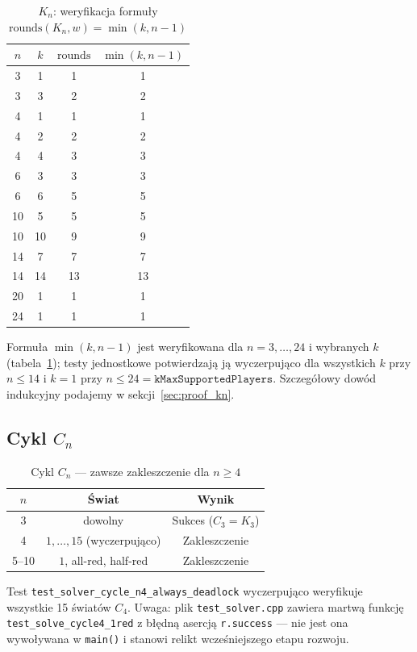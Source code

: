 \documentclass[12pt,a4paper]{article}
\theoremstyle{plain}
\theoremstyle{definition}
\theoremstyle{remark}
\newcommand{\rounds}{\mathrm{rounds}}
\begin{document}
\begin{table}[h]
\centering
\caption{$K_n$: weryfikacja formuły $\rounds(K_n, w) = \min(k, n-1)$}
\label{tab:kn}
\begin{tabular}{cccc}
\toprule
$n$ & $k$ & $\rounds$ & $\min(k,n-1)$ \\
\midrule
3 & 1 & 1 & 1 \\
3 & 3 & 2 & 2 \\
4 & 1 & 1 & 1 \\
4 & 2 & 2 & 2 \\
4 & 4 & 3 & 3 \\
6 & 3 & 3 & 3 \\
6 & 6 & 5 & 5 \\
10 & 5 & 5 & 5 \\
10 & 10 & 9 & 9 \\
14 & 7 & 7 & 7 \\
14 & 14 & 13 & 13 \\
20 & 1 & 1 & 1 \\
24 & 1 & 1 & 1 \\
\bottomrule
\end{tabular}
\end{table}

Formuła $\min(k,n-1)$ jest weryfikowana dla $n = 3,\ldots,24$ i wybranych $k$ (tabela~\ref{tab:kn}); testy jednostkowe potwierdzają ją wyczerpująco dla wszystkich $k$ przy $n \le 14$ i $k=1$ przy $n \le 24 = \texttt{kMaxSupportedPlayers}$. Szczegółowy dowód indukcyjny podajemy w sekcji~\ref{sec:proof_kn}.

\subsection{Cykl $C_n$}

\begin{table}[h]
\centering
\caption{Cykl $C_n$ — zawsze zakleszczenie dla $n \ge 4$}
\begin{tabular}{ccc}
\toprule
$n$ & Świat & Wynik \\
\midrule
3 & dowolny & Sukces ($C_3 = K_3$) \\
4 & $1,\ldots,15$ (wyczerpująco) & Zakleszczenie \\
5--10 & $1$, all-red, half-red & Zakleszczenie \\
\bottomrule
\end{tabular}
\end{table}

Test \texttt{test\_solver\_cycle\_n4\_always\_deadlock} wyczerpująco weryfikuje wszystkie 15 światów $C_4$. Uwaga: plik \texttt{test\_solver.cpp} zawiera martwą funkcję \texttt{test\_solve\_cycle4\_1red} z błędną asercją \texttt{r.success} — nie jest ona wywoływana w \texttt{main()} i stanowi relikt wcześniejszego etapu rozwoju.
\end{document}
